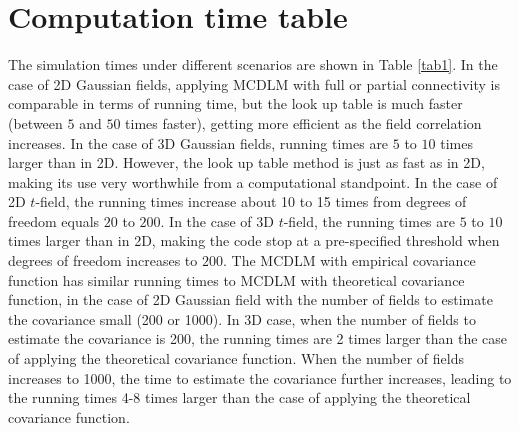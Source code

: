 \documentclass{article}
\begin{document}
\section{Computation time table\label{appendix.g}}
The simulation times under different scenarios are shown in Table \ref{tab1}. In the case of 2D Gaussian fields, applying MCDLM with full or partial connectivity is comparable in terms of running time, but the look up table is much faster (between $5$ and $50$ times faster), getting more efficient as the field correlation increases. In the case of 3D Gaussian fields, running times are $5$ to $10$ times larger than in 2D. However, the look up table method is just as fast as in 2D, making its use very worthwhile from a computational standpoint. In the case of 2D $t$-field, the running times increase about 10 to 15 times from degrees of freedom equals $20$ to $200$. In the case of 3D $t$-field, the running times are $5$ to $10$ times larger than in 2D, making the code stop at a pre-specified threshold when degrees of freedom increases to $200$. The MCDLM with empirical covariance function has similar running times to MCDLM with theoretical covariance function, in the case of 2D Gaussian field with the number of fields to estimate the covariance small (200 or 1000). In 3D case, when the number of fields to estimate the covariance is 200, the running times are 2 times larger than the case of applying the theoretical covariance function. When the number of fields increases to 1000, the time to estimate the covariance further increases, leading to the running times 4-8 times larger than the case of applying the theoretical covariance function.
\end{document}
